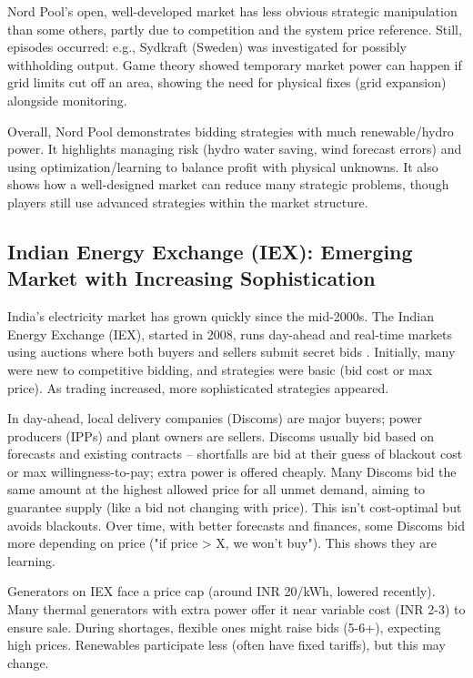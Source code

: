 \documentclass[conference]{IEEEtran}
\begin{document}
Nord Pool's open, well-developed market has less obvious strategic manipulation than some others, partly due to competition and the system price reference. Still, episodes occurred: e.g., Sydkraft (Sweden) was investigated for possibly withholding output. Game theory showed temporary market power can happen if grid limits cut off an area, showing the need for physical fixes (grid expansion) alongside monitoring.

Overall, Nord Pool demonstrates bidding strategies with much renewable/hydro power. It highlights managing risk (hydro water saving, wind forecast errors) and using optimization/learning to balance profit with physical unknowns. It also shows how a well-designed market can reduce many strategic problems, though players still use advanced strategies within the market structure.

\subsection{Indian Energy Exchange (IEX): Emerging Market with Increasing Sophistication}

India’s electricity market has grown quickly since the mid-2000s. The Indian Energy Exchange (IEX), started in 2008, runs day-ahead and real-time markets using auctions where both buyers and sellers submit secret bids \cite{IEX_Website}. Initially, many were new to competitive bidding, and strategies were basic (bid cost or max price). As trading increased, more sophisticated strategies appeared.

In day-ahead, local delivery companies (Discoms) are major buyers; power producers (IPPs) and plant owners are sellers. Discoms usually bid based on forecasts and existing contracts – shortfalls are bid at their guess of blackout cost or max willingness-to-pay; extra power is offered cheaply. Many Discoms bid the same amount at the highest allowed price for all unmet demand, aiming to guarantee supply (like a bid not changing with price). This isn't cost-optimal but avoids blackouts. Over time, with better forecasts and finances, some Discoms bid more depending on price ("if price > X, we won't buy"). This shows they are learning.

Generators on IEX face a price cap (around INR 20/kWh, lowered recently). Many thermal generators with extra power offer it near variable cost (INR 2-3) to ensure sale. During shortages, flexible ones might raise bids (5-6+), expecting high prices. Renewables participate less (often have fixed tariffs), but this may change.
\end{document}
